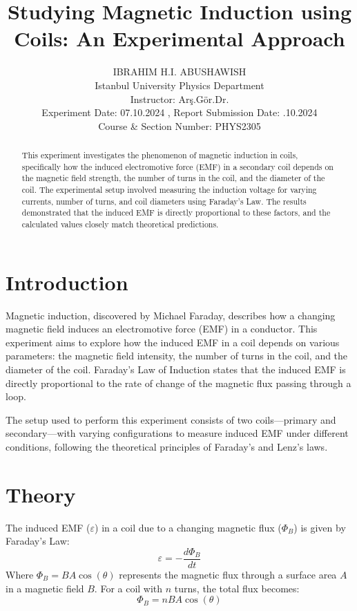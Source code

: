 \documentclass[journal]{IEEEtran}
\begin{document}
\title{Studying Magnetic Induction using Coils: An Experimental Approach}
\author{IBRAHIM H.I. ABUSHAWISH\\
Istanbul University Physics Department\\
Instructor: Arş.Gör.Dr. \\
Experiment Date: 07.10.2024 , Report Submission Date:  .10.2024\\
Course \& Section Number: PHYS2305}

\maketitle

\begin{abstract}
    This experiment investigates the phenomenon of magnetic induction in coils, specifically how the induced electromotive force (EMF) in a secondary coil depends on the magnetic field strength, the number of turns in the coil, and the diameter of the coil. The experimental setup involved measuring the induction voltage for varying currents, number of turns, and coil diameters using Faraday's Law. The results demonstrated that the induced EMF is directly proportional to these factors, and the calculated values closely match theoretical predictions.
\end{abstract}

\section{Introduction}
Magnetic induction, discovered by Michael Faraday, describes how a changing magnetic field induces an electromotive force (EMF) in a conductor. This experiment aims to explore how the induced EMF in a coil depends on various parameters: the magnetic field intensity, the number of turns in the coil, and the diameter of the coil. Faraday’s Law of Induction states that the induced EMF is directly proportional to the rate of change of the magnetic flux passing through a loop.

The setup used to perform this experiment consists of two coils—primary and secondary—with varying configurations to measure induced EMF under different conditions, following the theoretical principles of Faraday's and Lenz's laws.

\section{Theory}
The induced EMF (\(\varepsilon\)) in a coil due to a changing magnetic flux (\(\Phi_B\)) is given by Faraday’s Law:
\begin{equation}
    \varepsilon = - \frac{d\Phi_B}{dt}
\end{equation}
Where \(\Phi_B = B A \cos(\theta)\) represents the magnetic flux through a surface area \(A\) in a magnetic field \(B\). For a coil with \(n\) turns, the total flux becomes:
\begin{equation}
    \Phi_B = n B A \cos(\theta)
\end{equation}
\end{document}
